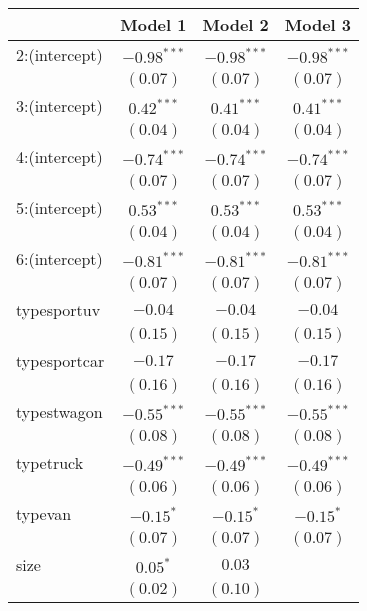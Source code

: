 
\begin{table}
\tiny
\begin{center}
\begin{tabular}{l c c c }
\hline
 & Model 1 & Model 2 & Model 3 \\
\hline
2:(intercept)    & $-0.98^{***}$ & $-0.98^{***}$ & $-0.98^{***}$ \\
                 & $(0.07)$      & $(0.07)$      & $(0.07)$      \\
3:(intercept)    & $0.42^{***}$  & $0.41^{***}$  & $0.41^{***}$  \\
                 & $(0.04)$      & $(0.04)$      & $(0.04)$      \\
4:(intercept)    & $-0.74^{***}$ & $-0.74^{***}$ & $-0.74^{***}$ \\
                 & $(0.07)$      & $(0.07)$      & $(0.07)$      \\
5:(intercept)    & $0.53^{***}$  & $0.53^{***}$  & $0.53^{***}$  \\
                 & $(0.04)$      & $(0.04)$      & $(0.04)$      \\
6:(intercept)    & $-0.81^{***}$ & $-0.81^{***}$ & $-0.81^{***}$ \\
                 & $(0.07)$      & $(0.07)$      & $(0.07)$      \\
typesportuv      & $-0.04$       & $-0.04$       & $-0.04$       \\
                 & $(0.15)$      & $(0.15)$      & $(0.15)$      \\
typesportcar     & $-0.17$       & $-0.17$       & $-0.17$       \\
                 & $(0.16)$      & $(0.16)$      & $(0.16)$      \\
typestwagon      & $-0.55^{***}$ & $-0.55^{***}$ & $-0.55^{***}$ \\
                 & $(0.08)$      & $(0.08)$      & $(0.08)$      \\
typetruck        & $-0.49^{***}$ & $-0.49^{***}$ & $-0.49^{***}$ \\
                 & $(0.06)$      & $(0.06)$      & $(0.06)$      \\
typevan          & $-0.15^{*}$   & $-0.15^{*}$   & $-0.15^{*}$   \\
                 & $(0.07)$      & $(0.07)$      & $(0.07)$      \\
size             & $0.05^{*}$    & $0.03$        &               \\
                 & $(0.02)$      & $(0.10)$      &               \\

\end{tabular}
\end{center}
\end{table}
